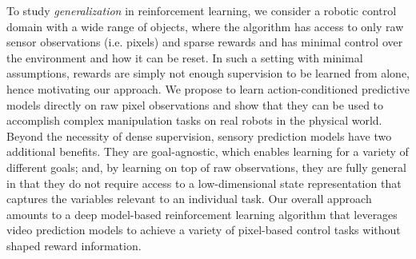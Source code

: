 To study \emph{generalization} in reinforcement learning, we consider a robotic control domain with a wide range of objects, where the algorithm has access to only raw sensor observations (i.e. pixels) and sparse rewards and has minimal control over the environment and how it can be reset. In such a setting with minimal assumptions, rewards are simply not enough supervision
to be learned from alone, hence motivating our approach. %
We propose to learn action-conditioned predictive models directly on raw pixel observations and show that they can be used to accomplish complex manipulation tasks on real robots in the physical world.
Beyond the necessity of dense supervision, sensory prediction models have two additional benefits. They are goal-agnostic, which enables learning for a variety of different goals; and, by learning on top of raw observations, they are fully general in that they do not require access to a low-dimensional state representation that captures the variables relevant to an individual task.
Our overall approach amounts to a deep model-based reinforcement learning algorithm that leverages video prediction models to achieve a variety of pixel-based control tasks without shaped reward information.


